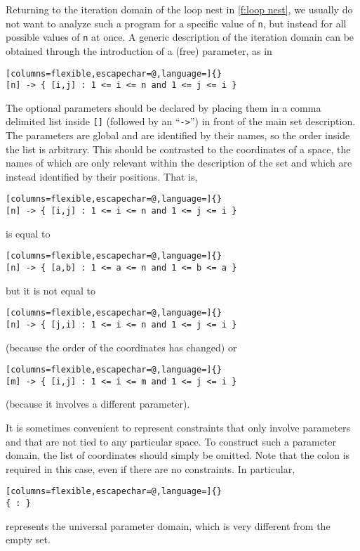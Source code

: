 Returning to the iteration domain of the loop nest
in \autoref{f:loop nest}, we usually do not want to analyze
such a program for a specific value of \lstinline{n},
but instead for all possible values of \lstinline{n} at once.
A generic description of the iteration domain can be obtained
through the introduction of a (free) parameter, as in
\begin{lstlisting}[columns=flexible,escapechar=@,language=]{}
[n] -> { [i,j] : 1 <= i <= n and 1 <= j <= i }
\end{lstlisting}
The optional parameters should
be declared by placing them in a comma delimited list inside \lstinline![]!
(followed by an ``\lstinline!->!'') in front of the main set description.
The parameters are global and are identified by their names,
so the order inside the list is arbitrary.
This should be contrasted to the coordinates of a space, the names of
which are only relevant within the description of the set and which
are instead identified by their positions.
That is,
\begin{lstlisting}[columns=flexible,escapechar=@,language=]{}
[n] -> { [i,j] : 1 <= i <= n and 1 <= j <= i }
\end{lstlisting}
is equal to
\begin{lstlisting}[columns=flexible,escapechar=@,language=]{}
[n] -> { [a,b] : 1 <= a <= n and 1 <= b <= a }
\end{lstlisting}
but it is not equal to
\begin{lstlisting}[columns=flexible,escapechar=@,language=]{}
[n] -> { [j,i] : 1 <= i <= n and 1 <= j <= i }
\end{lstlisting}
(because the order of the coordinates has changed)
or
\begin{lstlisting}[columns=flexible,escapechar=@,language=]{}
[m] -> { [i,j] : 1 <= i <= m and 1 <= j <= i }
\end{lstlisting}
(because it involves a different parameter).

It is sometimes convenient to represent constraints that only
involve parameters and that are not tied to any particular space.
To construct such a parameter domain, the list of coordinates
should simply be omitted.  Note that the colon is required
in this case, even if there are no constraints.
In particular,
\begin{lstlisting}[columns=flexible,escapechar=@,language=]{}
{ : }
\end{lstlisting}
represents the universal parameter domain, which is very different
from the empty set.

